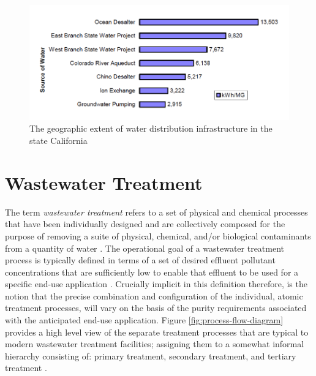      \begin{figure}[!h]
       \centering
       \includegraphics[width=5.5in]{figures/energy-intensity.png}
       \caption[Energy Intensity of Water Distribution Infrastructure]{The geographic extent of water distribution infrastructure in the state California \cite{Klein2005}}
       \label{fig:infrastructure-energy-intensity}
     \end{figure}
     
\section{Wastewater Treatment}

The term \textit{wastewater treatment} refers to a set of physical and chemical processes that have been individually designed and are collectively composed for the purpose of removing a suite of physical, chemical, and/or biological contaminants from a quantity of water \cite{Metcalf1991}. The operational goal of a wastewater treatment process is typically defined in terms of a set of desired effluent pollutant concentrations that are sufficiently low to enable that effluent to be used for a specific end-use application \cite{Asano2007}. Crucially implicit in this definition therefore, is the notion that the precise combination and configuration of the individual, atomic treatment processes, will vary on the basis of the purity requirements associated with the anticipated end-use application. Figure \ref{fig:process-flow-diagram} provides a high level view of the separate treatment processes that are typical to modern wastewater treatment facilities; assigning them to a somewhat informal hierarchy consisting of: primary treatment, secondary treatment, and tertiary treatment \cite{Asano2007}.

